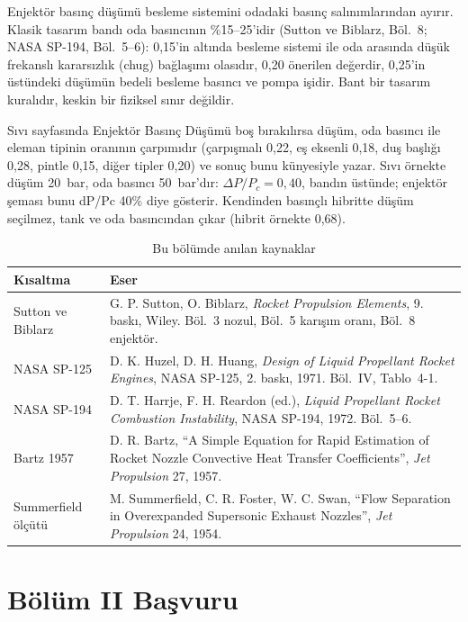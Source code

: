 \documentclass[11pt,a4paper]{article}
\newcommand{\ui}[1]{\textsf{#1}}
\begin{document}
Enjektör basınç düşümü besleme sistemini odadaki basınç salınımlarından ayırır.
Klasik tasarım bandı oda basıncının \%15--25'idir (Sutton ve Biblarz, Böl.~8;
NASA SP-194, Böl.~5--6): 0,15'in altında besleme sistemi ile oda arasında
düşük frekanslı kararsızlık (chug) bağlaşımı olasıdır, 0,20 önerilen değerdir,
0,25'in üstündeki düşümün bedeli besleme basıncı ve pompa işidir. Bant bir
tasarım kuralıdır, keskin bir fiziksel sınır değildir.

Sıvı sayfasında \ui{Enjektör Basınç Düşümü} boş bırakılırsa düşüm, oda basıncı
ile eleman tipinin oranının çarpımıdır (çarpışmalı 0,22, eş eksenli 0,18, duş
başlığı 0,28, pintle 0,15, diğer tipler 0,20) ve sonuç bunu künyesiyle yazar.
Sıvı örnekte düşüm 20~bar, oda basıncı 50~bar'dır: $\Delta P/P_c = 0{,}40$,
bandın üstünde; enjektör şeması bunu \ui{dP/Pc 40\%} diye gösterir. Kendinden
basınçlı hibritte düşüm seçilmez, tank ve oda basıncından çıkar (hibrit
örnekte 0,68).

\begin{table}[htbp]
\centering\small
\caption{Bu bölümde anılan kaynaklar}\label{tab:yontem-kaynak}
\begin{tabular}{@{}>{\raggedright\arraybackslash}p{3.4cm}>{\raggedright\arraybackslash}p{12.2cm}@{}}
\toprule
\textbf{Kısaltma} & \textbf{Eser} \\
\midrule
Sutton ve Biblarz & G. P. Sutton, O. Biblarz, \emph{Rocket Propulsion Elements}, 9. baskı, Wiley. Böl.~3 nozul, Böl.~5 karışım oranı, Böl.~8 enjektör. \\
NASA SP-125 & D. K. Huzel, D. H. Huang, \emph{Design of Liquid Propellant Rocket Engines}, NASA SP-125, 2. baskı, 1971. Böl.~IV, Tablo~4-1. \\
NASA SP-194 & D. T. Harrje, F. H. Reardon (ed.), \emph{Liquid Propellant Rocket Combustion Instability}, NASA SP-194, 1972. Böl.~5--6. \\
Bartz 1957 & D. R. Bartz, ``A Simple Equation for Rapid Estimation of Rocket Nozzle Convective Heat Transfer Coefficients'', \emph{Jet Propulsion} 27, 1957. \\
Summerfield ölçütü & M. Summerfield, C. R. Foster, W. C. Swan, ``Flow Separation in Overexpanded Supersonic Exhaust Nozzles'', \emph{Jet Propulsion} 24, 1954. \\
\bottomrule
\end{tabular}
\end{table}

\part*{Bölüm II \quad Başvuru}
\end{document}
